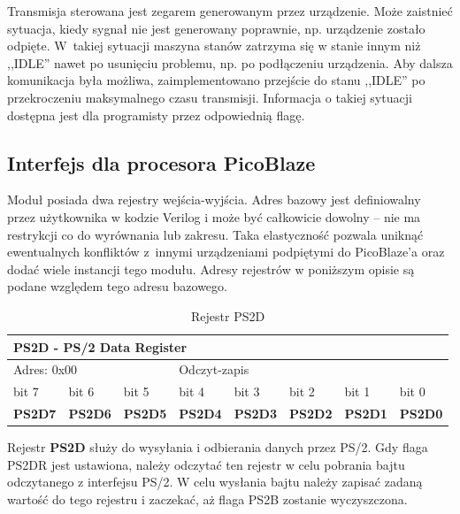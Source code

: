 Transmisja sterowana jest zegarem generowanym przez urządzenie. Może zaistnieć sytuacja, kiedy sygnał nie jest generowany poprawnie, np. urządzenie zostało odpięte. W~takiej sytuacji maszyna stanów zatrzyma się w stanie innym niż ,,IDLE'' nawet po usunięciu problemu, np. po podłączeniu urządzenia. Aby dalsza komunikacja była możliwa, zaimplementowano przejście do stanu ,,IDLE'' po przekroczeniu maksymalnego czasu transmisji. Informacja o takiej sytuacji dostępna jest dla programisty przez odpowiednią flagę.

\subsection{Interfejs dla procesora PicoBlaze}
\label{Interfejs_dla_procesora_PicoBlaze}

Moduł posiada dwa rejestry wejścia-wyjścia. Adres bazowy jest definiowalny przez użytkownika w kodzie Verilog i może być całkowicie dowolny -- nie ma restrykcji co do wyrównania lub zakresu. Taka elastyczność pozwala uniknąć ewentualnych konfliktów z~innymi urządzeniami podpiętymi do PicoBlaze'a oraz dodać wiele instancji tego modułu. Adresy rejestrów w poniższym opisie są podane względem tego adresu bazowego.


\begin{table}[h]
	\begin{center}
	{\footnotesize
		\begin{tabular}{|l|l|l|l|l|l|l|l|}
			\hline
			\multicolumn{8}{|l|}{ \textbf{PS2D - PS/2 Data Register} } \\
			\hline
			\multicolumn{3}{|l}{ Adres: 0x00 } & \multicolumn{5}{l|}{ Odczyt-zapis } \\
			\hline
			\hline bit 7 & bit 6 & bit 5 & bit 4 & bit 3 & bit 2 & bit 1 & bit 0 \\				
			\hline \textbf{PS2D7} & \textbf{PS2D6} & \textbf{PS2D5} & \textbf{PS2D4} & \textbf{PS2D3} & \textbf{PS2D2} & \textbf{PS2D1} & \textbf{PS2D0} \\				
			\hline
		\end{tabular}}
		\caption{ Rejestr PS2D }
		\label{tab:regPS2D}
	\end{center}
\end{table}


Rejestr \textbf{PS2D} służy do wysyłania i odbierania danych przez PS/2. Gdy flaga PS2DR jest ustawiona, należy odczytać ten rejestr w celu pobrania bajtu odczytanego z interfejsu PS/2. W celu wysłania bajtu należy zapisać zadaną wartość do tego rejestru i zaczekać, aż flaga PS2B zostanie wyczyszczona.



